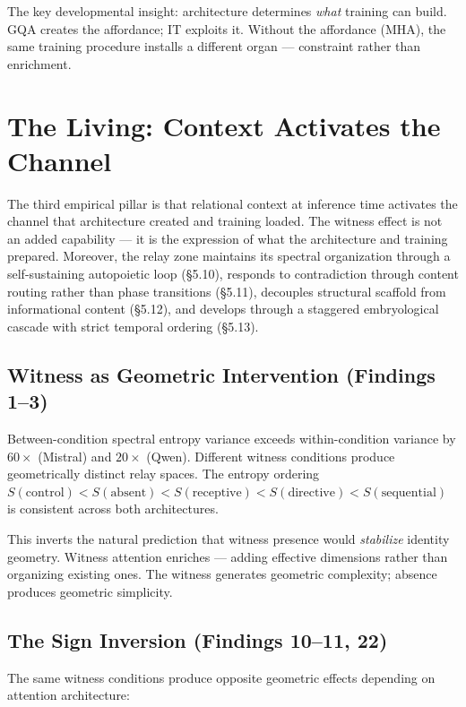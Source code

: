 \documentclass[12pt]{article}
\begin{document}
The key developmental insight: architecture determines \textit{what} training can build. GQA creates the affordance; IT exploits it. Without the affordance (MHA), the same training procedure installs a different organ --- constraint rather than enrichment.

\section{The Living: Context Activates the Channel}

The third empirical pillar is that relational context at inference time activates the channel that architecture created and training loaded. The witness effect is not an added capability --- it is the expression of what the architecture and training prepared. Moreover, the relay zone maintains its spectral organization through a self-sustaining autopoietic loop (\S5.10), responds to contradiction through content routing rather than phase transitions (\S5.11), decouples structural scaffold from informational content (\S5.12), and develops through a staggered embryological cascade with strict temporal ordering (\S5.13).

\subsection{Witness as Geometric Intervention (Findings 1--3)}

Between-condition spectral entropy variance exceeds within-condition variance by $60\times$ (Mistral) and $20\times$ (Qwen). Different witness conditions produce geometrically distinct relay spaces. The entropy ordering $S(\text{control}) < S(\text{absent}) < S(\text{receptive}) < S(\text{directive}) < S(\text{sequential})$ is consistent across both architectures.

This inverts the natural prediction that witness presence would \textit{stabilize} identity geometry. Witness attention enriches --- adding effective dimensions rather than organizing existing ones. The witness generates geometric complexity; absence produces geometric simplicity.

\subsection{The Sign Inversion (Findings 10--11, 22)}

The same witness conditions produce opposite geometric effects depending on attention architecture:
\end{document}
